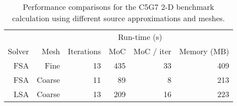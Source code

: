 {{{      \begin{table}[htbp]
        \centering
        \caption{Performance comparisons for the C5G7 2-D benchmark calculation using different source approximations and meshes.}
        \label{tab:LSMOC:C5G7:Performance}
        \begin{tabular}{rrrrrr}\toprule
                 &      &            & \multicolumn{2}{c}{Run-time (s)} & \\\cline{4-5}
          Solver & Mesh & Iterations & MoC & MoC / iter  & Memory (MB)\\\midrule
          FSA    & Fine   & 13         & 435 & 33 & 409\\
          FSA    & Coarse & 11         &  89 &  8 & 213\\
          LSA    & Coarse & 13         & 209 & 16 & 223\\\bottomrule
        \end{tabular}
      \end{table}

}}}
